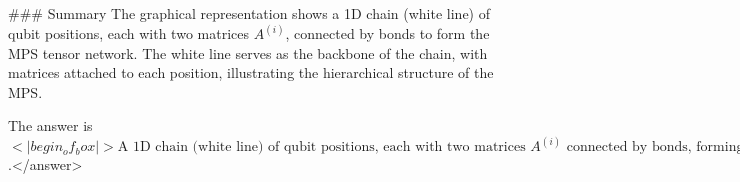 ### Summary  
The graphical representation shows a 1D chain (white line) of qubit positions, each with two matrices \( A^{(i)} \), connected by bonds to form the MPS tensor network. The white line serves as the backbone of the chain, with matrices attached to each position, illustrating the hierarchical structure of the MPS.  

The answer is \(<|begin_of_box|>\text{A 1D chain (white line) of qubit positions, each with two matrices } A^{(i)} \text{ connected by bonds, forming an MPS tensor network}<|end_of_box|>\).</answer>